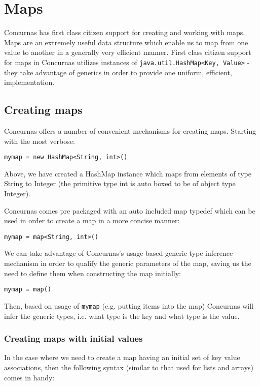 \documentclass[conc-doc]{subfiles}
\begin{document}
	
	\chapter[Maps]{Maps}
	
Concurnas has first class citizen support for creating and working with maps. Maps are an extremely useful data structure which enable us to map from one value to another in a generally very efficient manner. First class citizen support for maps in Concurnas utilizes instances of \lstinline{java.util.HashMap<Key, Value>} - they take advantage of generics in order to provide one uniform, efficient, implementation.

\section{Creating maps}
Concurnas offers a number of convenient mechanisms for creating maps. Starting with the most verbose:

\begin{lstlisting}
mymap = new HashMap<String, int>()
\end{lstlisting}

Above, we have created a HashMap instance which maps from elements of type String to Integer (the primitive type int is auto boxed to be of object type Integer).

Concurnas comes pre packaged with an auto included map typedef which can be used in order to create a map in a more concise manner:
\begin{lstlisting}
mymap = map<String, int>()
\end{lstlisting}

We can take advantage of Concurnas's usage based generic type inference mechanism in order to qualify the generic parameters of the map, saving us the need to define them when constructing the map initially:

\begin{lstlisting}
mymap = map()
\end{lstlisting}

Then, based on usage of \lstinline{mymap} (e.g. putting items into the map) Concurnas will infer the generic types, i.e. what type is the key and what type is the value.

\subsection{Creating maps with initial values}
In the case where we need to create a map having an initial set of key value associations, then the following syntax (similar to that used for lists and arrays) comes in handy:
\end{document}
